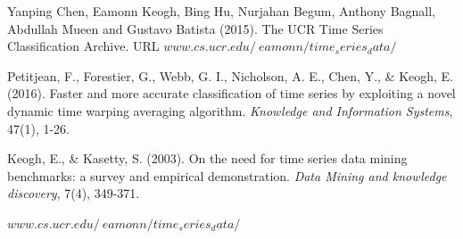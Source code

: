 \documentclass[10pt,a4paper]{article}
\begin{document}
\pagebreak
\begin{thebibliography}{9}

Yanping Chen, Eamonn Keogh, Bing Hu, Nurjahan Begum, Anthony Bagnall, Abdullah
Mueen and Gustavo Batista (2015). The UCR Time Series Classification Archive. URL $www.cs.ucr.edu/~eamonn/time_series_data/$

Petitjean, F., Forestier, G., Webb, G. I., Nicholson, A. E., Chen, Y., \& Keogh, E. (2016). Faster and more accurate classification of time series by exploiting a novel dynamic time warping averaging algorithm. \textit{Knowledge and Information Systems}, 47(1), 1-26.

Keogh, E., \& Kasetty, S. (2003). On the need for time series data mining benchmarks: a survey and empirical demonstration. \textit{Data Mining and knowledge discovery}, 7(4), 349-371.

$www.cs.ucr.edu/~eamonn/time_series_data/$

\end{thebibliography}
\end{document}
